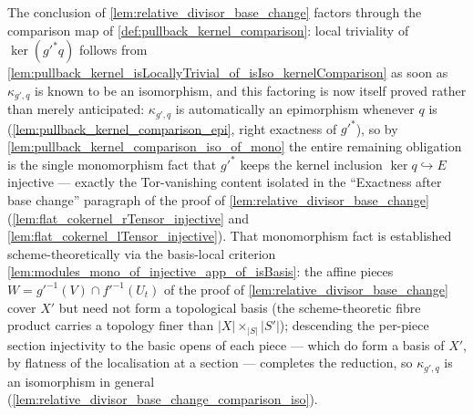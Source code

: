 \begin{remark}
  \label{rem:relative_divisor_base_change_kernel_comparison}
  The conclusion of \cref{lem:relative_divisor_base_change} factors through
  the comparison map of \cref{def:pullback_kernel_comparison}: local
  triviality of \(\ker(g'^{*} q)\) follows from
  \cref{lem:pullback_kernel_isLocallyTrivial_of_isIso_kernelComparison} as
  soon as \(\kappa_{g',q}\) is known to be an isomorphism, and this
  factoring is now itself proved rather than merely anticipated:
  \(\kappa_{g',q}\) is automatically an epimorphism whenever \(q\) is
  (\cref{lem:pullback_kernel_comparison_epi}, right exactness of
  \(g'^{*}\)), so by \cref{lem:pullback_kernel_comparison_iso_of_mono} the
  entire remaining obligation is the single monomorphism fact that
  \(g'^{*}\) keeps the kernel inclusion \(\ker q \hookrightarrow E\)
  injective --- exactly the Tor-vanishing content isolated in the
  ``Exactness after base change'' paragraph of the proof of
  \cref{lem:relative_divisor_base_change}
  (\cref{lem:flat_cokernel_rTensor_injective} and
  \cref{lem:flat_cokernel_lTensor_injective}).
  That monomorphism fact is established scheme-theoretically via the
  basis-local criterion \cref{lem:modules_mono_of_injective_app_of_isBasis}:
  the affine pieces \(W = g'^{-1}(V) \cap f'^{-1}(U_t)\) of the proof of
  \cref{lem:relative_divisor_base_change} cover \(X'\) but need not form a
  topological basis (the scheme-theoretic fibre product carries a
  topology finer than \(|X| \times_{|S|} |S'|\)); descending the
  per-piece section injectivity to the basic opens of each piece --- which
  do form a basis of \(X'\), by flatness of the localisation at a section
  --- completes the reduction, so \(\kappa_{g',q}\) is an isomorphism in
  general (\cref{lem:relative_divisor_base_change_comparison_iso}).
\end{remark}


